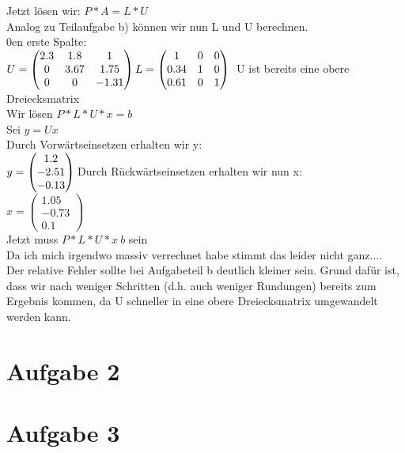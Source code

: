 \documentclass[10pt,a4paper]{article}
\begin{document}
Jetzt lösen wir:
$P*A = L*U$\\
Analog zu Teilaufgabe b) können wir nun L und U berechnen.\\
0en erste Spalte:\\
$U = \begin{pmatrix}
    2.3 & 1.8 & 1\\
    0 & 3.67 & 1.75\\
    0 & 0 & -1.31\\
\end{pmatrix}
L = \begin{pmatrix}
    1 & 0 & 0\\
    0.34 & 1 & 0\\
    0.61 & 0 & 1\\
\end{pmatrix}\\
$
U ist bereits eine obere Dreiecksmatrix\\
Wir lösen $P*L*U*x = b$\\
Sei $y = Ux$\\
Durch Vorwärtseinsetzen erhalten wir y:\\
$y = \begin{pmatrix}
    1.2\\
    -2.51\\
    -0.13\\
\end{pmatrix}\\
$Durch Rückwärtseinsetzen erhalten wir nun x:\\
$x = \begin{pmatrix}
    1.05\\
    -0.73\\
    0.1
\end{pmatrix}$\\
Jetzt muss $P*L*U*x~b$ sein\\
Da ich mich irgendwo massiv verrechnet habe stimmt das leider nicht ganz....\\
Der relative Fehler sollte bei Aufgabeteil b deutlich kleiner sein. Grund dafür ist, dass wir nach weniger Schritten (d.h. auch weniger Rundungen) bereits zum Ergebnis kommen, da U schneller in eine obere Dreiecksmatrix umgewandelt werden kann.\\

\section*{Aufgabe 2}


\section*{Aufgabe 3}

\end{document}
